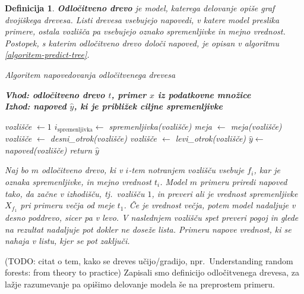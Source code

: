 \documentclass[12pt,a4paper]{article}
\newtheorem{definicija}{Definicija}
\begin{document}
\begin{definicija} 
\textbf{Odločitveno drevo} je model, katerega delovanje opiše graf dvojiškega drevesa. 
Listi drevesa vsebujejo napovedi, v katere model preslika primere, ostala vozlišča pa vsebujejo oznako spremenljivke in mejno vrednost. 
Postopek, s katerim odločitveno drevo določi napoved, je opisan v algoritmu \ref{algoritem-predict-tree}.

\begin{algorithm}[ht]
  \caption{Algoritem napovedovanja odločitvenega drevesa}
  \label{algoritem-predict-tree}
  \raggedright
  \textbf{Vhod: odločitveno drevo $t$, primer $x$ iz podatkovne množice}  \\
  \textbf{Izhod: napoved $\hat{y}$, ki je približek ciljne spremenljivke} 
  \begin{algorithmic}[1]
	\State vozlišče $\gets 1$
	   
		\State $i_{\mathrm{spremenljivka}} \gets$ spremenljivka(vozlišče)
		\State meja $\gets$ meja(vozlišče)
			\State vozlišče $\gets$ desni\_otrok(vozlišče)
		\Else
			\State vozlišče $\gets$ levi\_otrok(vozlišče)
		\EndIf
	\EndWhile
	\State $\hat{y} \gets$ napoved(vozlišče)   
	\State return $\hat{y}$
  \end{algorithmic}
\end{algorithm}

Naj bo $m$ odločitveno drevo, ki v $i$-tem notranjem vozlišču vsebuje $f_i$, kar je oznaka spremenljivke, in mejno vrednost $t_i$. 
Model $m$ primeru priredi napoved tako, da začne v izhodišču, tj.~vozlišču $1$, in preveri ali je vrednost spremenljivke $X_{f_1}$ pri primeru večja od meje $t_1$. 
Če je vrednost večja, potem model nadaljuje v desno poddrevo, sicer pa v levo. 
V naslednjem vozlišču spet preveri pogoj in glede na rezultat nadaljuje pot dokler ne doseže lista. 
Primeru napove vrednost, ki se nahaja v listu, kjer se pot zaključi.

\end{definicija}

(TODO: citat o tem, kako se dreves učijo/gradijo, npr.\ Understanding random forests: from theory to practice)
Zapisali smo definicijo odločitvenega drevesa, za lažje razumevanje pa opišimo delovanje modela še na preprostem primeru.
\end{document}
